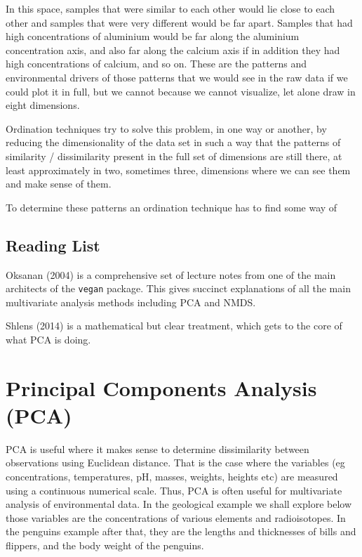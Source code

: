 \documentclass[
  letterpaper,
  DIV=11,
  numbers=noendperiod]{scrreprt}
\begin{document}
In this space, samples that were similar to each other would lie close
to each other and samples that were very different would be far apart.
Samples that had high concentrations of aluminium would be far along the
aluminium concentration axis, and also far along the calcium axis if in
addition they had high concentrations of calcium, and so on. These are
the patterns and environmental drivers of those patterns that we would
see in the raw data if we could plot it in full, but we cannot because
we cannot visualize, let alone draw in eight dimensions.

Ordination techniques try to solve this problem, in one way or another,
by reducing the dimensionality of the data set in such a way that the
patterns of similarity / dissimilarity present in the full set of
dimensions are still there, at least approximately in two, sometimes
three, dimensions where we can see them and make sense of them.

To determine these patterns an ordination technique has to find some way
of

\section{Reading List}\label{reading-list}

Oksanan (2004) is a comprehensive set of lecture notes from one of the
main architects of the \texttt{vegan} package. This gives succinct
explanations of all the main multivariate analysis methods including PCA
and NMDS.

Shlens (2014) is a mathematical but clear treatment, which gets to the
core of what PCA is doing.

\chapter{Principal Components Analysis
(PCA)}\label{principal-components-analysis-pca}

PCA is useful where it makes sense to determine dissimilarity between
observations using Euclidean distance. That is the case where the
variables (eg concentrations, temperatures, pH, masses, weights, heights
etc) are measured using a continuous numerical scale. Thus, PCA is often
useful for multivariate analysis of environmental data. In the
geological example we shall explore below those variables are the
concentrations of various elements and radioisotopes. In the penguins
example after that, they are the lengths and thicknesses of bills and
flippers, and the body weight of the penguins.
\end{document}
